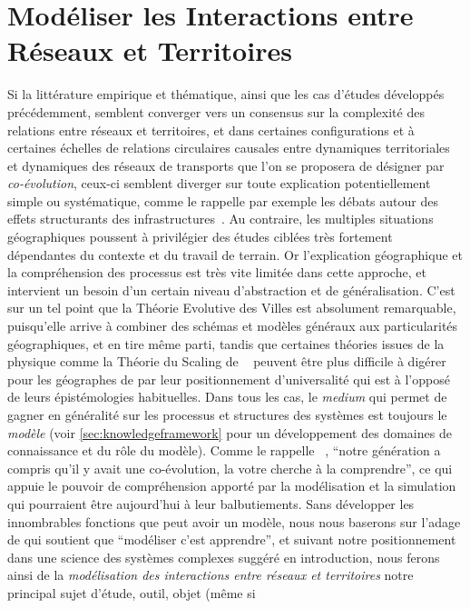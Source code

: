 

\chapter{Modéliser les Interactions entre Réseaux et Territoires}


\label{ch:modelinginteractions}





Si la littérature empirique et thématique, ainsi que les cas d'études développés précédemment, semblent converger vers un consensus sur la complexité des relations entre réseaux et territoires, et dans certaines configurations et à certaines échelles de relations circulaires causales entre dynamiques territoriales et dynamiques des réseaux de transports que l'on se proposera de désigner par \emph{co-évolution}, ceux-ci semblent diverger sur toute explication potentiellement simple ou systématique, comme le rappelle par exemple les débats autour des effets structurants des infrastructures~\cite{offner1993effets}. Au contraire, les multiples situations géographiques poussent à privilégier des études ciblées très fortement dépendantes du contexte et du travail de terrain. Or l'explication géographique et la compréhension des processus est très vite limitée dans cette approche, et intervient un besoin d'un certain niveau d'abstraction et de généralisation. C'est sur un tel point que la Théorie Evolutive des Villes est absolument remarquable, puisqu'elle arrive à combiner des schémas et modèles généraux aux particularités géographiques, et en tire même parti, tandis que certaines théories issues de la physique comme la Théorie du Scaling de ~\cite{west2017scaling} peuvent être plus difficile à digérer pour les géographes de par leur positionnement d'universalité qui est à l'opposé de leurs épistémologies habituelles. Dans tous les cas, le \emph{medium} qui permet de gagner en généralité sur les processus et structures des systèmes est toujours le \emph{modèle} (voir \ref{sec:knowledgeframework} pour un développement des domaines de connaissance et du rôle du modèle). Comme le rappelle ~\cite{raimbault2017entretiens}, ``notre génération a compris qu'il y avait une co-évolution, la votre cherche à la comprendre'', ce qui appuie le pouvoir de compréhension apporté par la modélisation et la simulation qui pourraient être aujourd'hui à leur balbutiements. Sans développer les innombrables fonctions que peut avoir un modèle, nous nous baserons sur l'adage de  qui soutient que ``modéliser c'est apprendre'', et suivant notre positionnement dans une science des systèmes complexes suggéré en introduction, nous ferons ainsi de la \emph{modélisation des interactions entre réseaux et territoires} notre principal sujet d'étude, outil, objet (même si 
